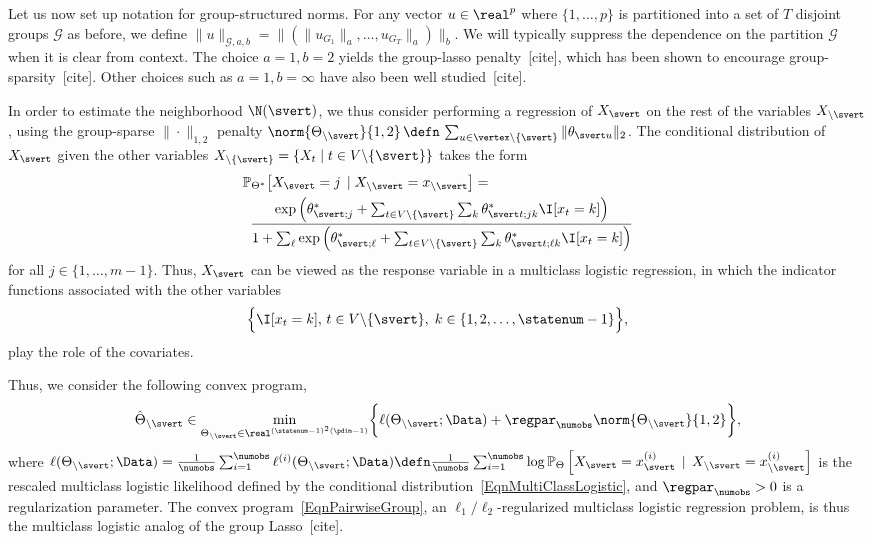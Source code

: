 Let us now set up notation for group-structured norms. For any vector $u \in \real^p$ where $\{1,\hdots,p\}$ is partitioned into a set of $T$ disjoint groups $\mathcal{G}$ as before, we define $\|u\|_{\mathcal{G},a,b} = \|(\|u_{G_1}\|_{a},\hdots, u_{G_T}\|_{a})\|_b$. We will typically suppress the dependence on the partition $\mathcal{G}$ when it is clear from context. The choice $a = 1, b = 2$ yields the group-lasso penalty~[cite], which has been shown to encourage group-sparsity~[cite]. Other choices such as $a = 1, b = \infty$ have also been well studied~[cite]. 

In order to estimate the neighborhood $\N(\svert)$, we thus consider performing a regression of $X_\svert$ on the rest of the variables $X_{\backslash \svert}$, using the group-sparse $\|\cdot\|_{1,2}$ penalty $\norm{\Theta_{\backslash \svert}}{1,2} \, \defn \, \sum_{u \in \vertex \backslash \{\svert\}} \|\theta_{\svert u}\|_2$. The conditional distribution of $X_\svert$ given the other variables $X_{\backslash \{\svert\}} = \{X_{t}\;|\; t \in V \backslash \{\svert\}\}$ takes the form
\begin{align}
\label{EqnMultiClassLogistic}
\nonumber & \mathbb{P}_{\Theta^*} \big[X_\svert = j \, \mid X_{\backslash \svert} = x_{\backslash \svert}\big] = \\
& \;\; \frac{\exp\left(\theta_{\svert;j}^* + \sum_{t \in V\backslash \{\svert\}} \sum_{k} \theta^*_{\svert t;jk} \I[x_t = k]\right)} {1+\sum_{\ell}\exp\left(\theta_{\svert;\ell}^* + \sum_{t \in V\backslash \{\svert\}} \sum_{k} \theta^*_{\svert t;\ell k} \I[x_t = k]\right)}
\end{align}
for all $j \in \{1,\hdots,m-1\}$. Thus, $X_\svert$ can be viewed as the response variable in a multiclass
logistic regression, in which the indicator functions associated with
the other variables
\begin{equation*}
\Big\{\I[x_t = k] ,\,t \in V \backslash \{\svert\}, \; k\in \{1, 2, \ldots,
\statenum-1\}\Big\},
\end{equation*}
play the role of the covariates.

Thus, we consider the following convex program,
\begin{equation}
\label{EqnPairwiseGroup}
\hat{\Theta}_{\backslash \svert} \in \min_{\Theta_{\backslash \svert} \in \real^{(\statenum-1)^2(\pdim-1)}} \biggr\{ \ell(\Theta_{\backslash \svert}; \Data) +
	\regpar_\numobs \norm{\Theta_{\backslash \svert}}{1,2}
	\biggr\},
\end{equation}
where $\ell(\Theta_{\backslash \svert}; \Data) = \frac{1}{\numobs} \sum_{i=1}^\numobs \ell^{(i)}(\Theta_{\backslash \svert}; \Data) \defn
\frac{1}{\numobs} \sum_{i=1}^\numobs \log \mathbb{P}_{\Theta}
\left[X_\svert = x^{(i)}_{\svert} \, \mid \, X_{\backslash\svert} = x^{(i)}_{\backslash \svert} \right]$
is the rescaled multiclass logistic likelihood defined by the conditional distribution~\eqref{EqnMultiClassLogistic}, and
$\regpar_\numobs > 0$ is a regularization parameter. The convex program~\eqref{EqnPairwiseGroup}, an $\ell_1/\ell_2$-regularized multiclass logistic regression problem, is thus the multiclass logistic analog of the group Lasso~[cite]. 

